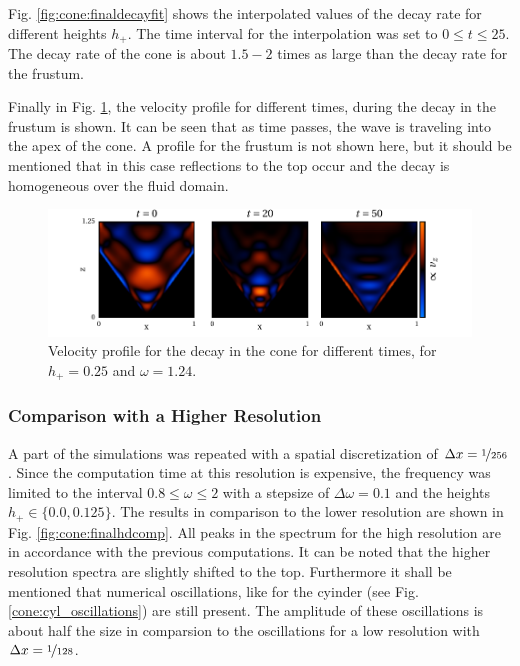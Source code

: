 Fig. \ref{fig:cone:finaldecayfit} shows the interpolated values of the decay rate for different
heights $h_+$.  The time interval for the interpolation was set to $0 \leq t \leq 25$.
The decay rate of the cone is about $1.5-2$ times as large than the decay rate for the frustum.

Finally in Fig. \ref{fig:cone:decayphaseexample}, the velocity profile for different times, during the decay in
the frustum is shown.
It can be seen that as time passes, the wave is traveling into the apex of the cone.
A profile for the frustum is not shown here, but it should be mentioned that in this case reflections to the top occur
and the decay is homogeneous over the fluid domain.

\begin{figure}[!b]
  \centering
  \includegraphics{gfx/cone/final/decay/phase_decay.pdf}
  \caption{
      \label{fig:cone:decayphaseexample}
        Velocity profile for the decay in the cone for different times, for $h_+=0.25$ and $\omega=1.24$.
    }
\end{figure}

\subsubsection{Comparison with a Higher Resolution}

A part of the simulations was repeated with a spatial discretization of $\Delta x= \nicefrac{1}{256}$.
Since the computation time at this resolution is expensive, the frequency was limited
to the interval $0.8\leq\omega\leq2$ with a stepsize of $\Delta \omega = 0.1$ and the heights
$h_+\in\{0.0, 0.125\}$.
The results in comparison to the lower resolution are shown in Fig. \ref{fig:cone:finalhdcomp}.
All peaks in the spectrum for the high resolution are in accordance with the previous computations.
It can be noted that the higher resolution spectra are slightly shifted to the top.
Furthermore it shall be mentioned that numerical oscillations, like for the cyinder
(see Fig. \ref{cone:cyl_oscillations}) are still present.
The amplitude of these oscillations is about half the size in comparsion to the oscillations for
a low resolution with $\Delta x = \nicefrac{1}{128}$.

